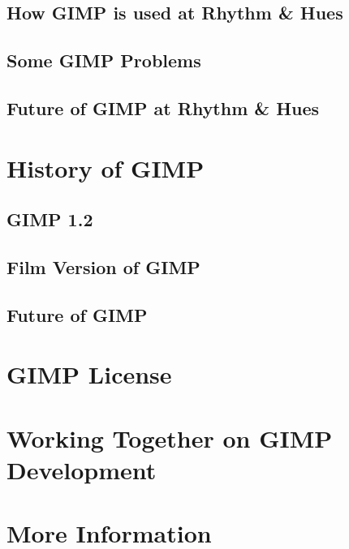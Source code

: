 \documentclass{report}
\begin{document}
\section{How GIMP is used at Rhythm \& Hues}
\label{sec:How_GIMP_is_used_at_Rhythm_Hues}


\section{Some GIMP Problems}
\label{sec:Some_GIMP_Problems}


\section{Future of GIMP at Rhythm \& Hues} 
\label{sec:Future_of_GIMP_at_Rhythm_Hues}


\chapter{History of GIMP}
\label{ch:History_of_GIMP} 


\section{GIMP 1.2}
\label{sec:GIMP_1.2}


\section{Film Version of GIMP} 
\label{sec:Film_Version_of_GIMP}


\section{Future of GIMP} 
\label{sec:Future_of_GIMP}



\chapter{GIMP License}
\label{ch:GIMP_License}



\chapter{Working Together on GIMP Development}
\label{ch:Working_Together_on_GIMP_Development}



\chapter{More Information}
\label{ch:More_Information}


{
\small


}
\end{document}
